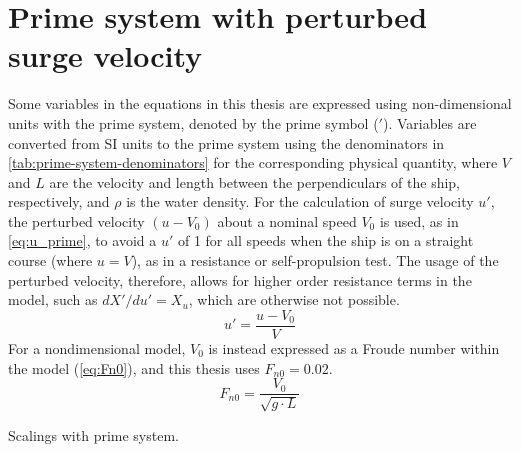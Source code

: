 \section{Prime system with perturbed surge velocity} \label{sec:prime_system}
Some variables in the equations in this thesis are expressed using non-dimensional units with the prime system, denoted by the prime symbol ($'$). Variables are converted from SI units to the prime system using the denominators in \autoref{tab:prime-system-denominators} for the corresponding physical quantity, where $V$ and $L$ are the velocity and length between the perpendiculars of the ship, respectively, and $\rho$ is the water density.
For the calculation of surge velocity $u'$, the perturbed velocity $(u-V_0)$ about a nominal speed $V_0$ is used, as in \autoref{eq:u_prime}, to avoid a $u'$ of 1 for all speeds when the ship is on a straight course (where $u=V$), as in a resistance or self-propulsion test. The usage of the perturbed velocity, therefore, allows for higher order resistance terms in the model, such as ${{dX}'/du}' = X_{u}$, which are otherwise not possible. 
\begin{equation}
    \label{eq:u_prime}
    u' = \frac{u-V_0}{V}
\end{equation}
For a nondimensional model, $V_0$ is instead expressed as a Froude number within the model (\autoref{eq:Fn0}), and this thesis uses $F_{n0}=0.02$.
\begin{equation}
    \label{eq:Fn0}
    F_{n0} = \frac{V_0}{\sqrt{g \cdot L}}
\end{equation}
\begin{table}[h]
    \centering
    \caption{Scalings with prime system.}
    \label{tab:prime-system-denominators}
\end{table}